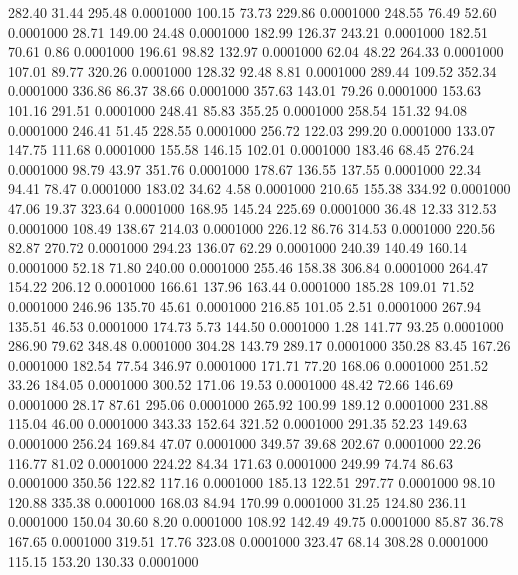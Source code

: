  282.40   31.44  295.48   0.0001000
 100.15   73.73  229.86   0.0001000
 248.55   76.49   52.60   0.0001000
  28.71  149.00   24.48   0.0001000
 182.99  126.37  243.21   0.0001000
 182.51   70.61    0.86   0.0001000
 196.61   98.82  132.97   0.0001000
  62.04   48.22  264.33   0.0001000
 107.01   89.77  320.26   0.0001000
 128.32   92.48    8.81   0.0001000
 289.44  109.52  352.34   0.0001000
 336.86   86.37   38.66   0.0001000
 357.63  143.01   79.26   0.0001000
 153.63  101.16  291.51   0.0001000
 248.41   85.83  355.25   0.0001000
 258.54  151.32   94.08   0.0001000
 246.41   51.45  228.55   0.0001000
 256.72  122.03  299.20   0.0001000
 133.07  147.75  111.68   0.0001000
 155.58  146.15  102.01   0.0001000
 183.46   68.45  276.24   0.0001000
  98.79   43.97  351.76   0.0001000
 178.67  136.55  137.55   0.0001000
  22.34   94.41   78.47   0.0001000
 183.02   34.62    4.58   0.0001000
 210.65  155.38  334.92   0.0001000
  47.06   19.37  323.64   0.0001000
 168.95  145.24  225.69   0.0001000
  36.48   12.33  312.53   0.0001000
 108.49  138.67  214.03   0.0001000
 226.12   86.76  314.53   0.0001000
 220.56   82.87  270.72   0.0001000
 294.23  136.07   62.29   0.0001000
 240.39  140.49  160.14   0.0001000
  52.18   71.80  240.00   0.0001000
 255.46  158.38  306.84   0.0001000
 264.47  154.22  206.12   0.0001000
 166.61  137.96  163.44   0.0001000
 185.28  109.01   71.52   0.0001000
 246.96  135.70   45.61   0.0001000
 216.85  101.05    2.51   0.0001000
 267.94  135.51   46.53   0.0001000
 174.73    5.73  144.50   0.0001000
   1.28  141.77   93.25   0.0001000
 286.90   79.62  348.48   0.0001000
 304.28  143.79  289.17   0.0001000
 350.28   83.45  167.26   0.0001000
 182.54   77.54  346.97   0.0001000
 171.71   77.20  168.06   0.0001000
 251.52   33.26  184.05   0.0001000
 300.52  171.06   19.53   0.0001000
  48.42   72.66  146.69   0.0001000
  28.17   87.61  295.06   0.0001000
 265.92  100.99  189.12   0.0001000
 231.88  115.04   46.00   0.0001000
 343.33  152.64  321.52   0.0001000
 291.35   52.23  149.63   0.0001000
 256.24  169.84   47.07   0.0001000
 349.57   39.68  202.67   0.0001000
  22.26  116.77   81.02   0.0001000
 224.22   84.34  171.63   0.0001000
 249.99   74.74   86.63   0.0001000
 350.56  122.82  117.16   0.0001000
 185.13  122.51  297.77   0.0001000
  98.10  120.88  335.38   0.0001000
 168.03   84.94  170.99   0.0001000
  31.25  124.80  236.11   0.0001000
 150.04   30.60    8.20   0.0001000
 108.92  142.49   49.75   0.0001000
  85.87   36.78  167.65   0.0001000
 319.51   17.76  323.08   0.0001000
 323.47   68.14  308.28   0.0001000
 115.15  153.20  130.33   0.0001000
